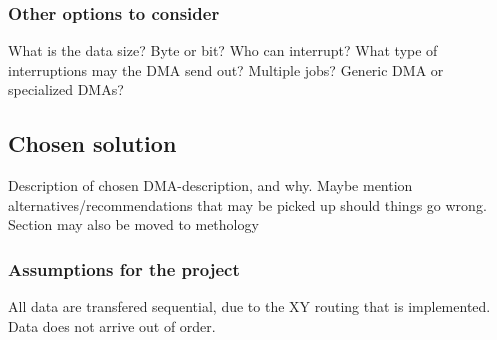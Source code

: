\subsubsection{Other options to consider}
What is the data size? 
Byte or bit? 
Who can interrupt? 
What type of interruptions may the DMA send out? 
Multiple jobs?
Generic DMA or specialized DMAs?


\subsection{Chosen solution}

Description of chosen DMA-description, and why.
Maybe mention alternatives/recommendations that may be picked up should things go wrong.
\\
Section may also be moved to methology

\subsubsection{Assumptions for the project}
All data are transfered sequential, due to the XY routing that is implemented.
Data does not arrive out of order.


















